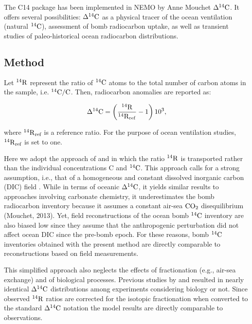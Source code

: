\documentclass[../main/TOP_manual]{subfiles}
\begin{document}
The C14 package has been implemented in NEMO by Anne Mouchet $\Delta ^{14}\mathrm{C}$.
It offers several possibilities: $\Delta ^{14}\mathrm{C}$ as a physical tracer of the ocean ventilation (natural $\mathrm{^{14}C}$), assessment of bomb radiocarbon uptake, as well as transient studies of paleo-historical ocean radiocarbon distributions.

\subsection*{Method}

Let  $\mathrm{^{14}{R}}$ represent the ratio of $\mathrm{^{14}C}$ atoms to the total number of carbon atoms in the sample, i.e. $\mathrm{^{14}C}/\mathrm{C}$.
Then, radiocarbon anomalies are reported as:

\begin{equation}
\Delta ^{14}\mathrm{C} = \left( \frac{\mathrm{^{14}{R}}}{\mathrm{^{14}{R}}_\mathrm{ref}} - 1 \right) 10^3, \label{eq:c14dcq}
\end{equation}

where $\mathrm{^{14}{R}}_{\textrm{ref}}$ is a reference ratio.
For the purpose of ocean ventilation studies, $\mathrm{^{14}{R}}_{\textrm{ref}}$ is set to one.

Here we adopt the approach of \cite{fiadeiro_1982} and \cite{toggweiler_1989a,toggweiler_1989b} in which  the ratio $\mathrm{^{14}{R}}$ is transported rather than the individual concentrations C and $\mathrm{^{14}C}$.
This approach calls for a strong assumption, i.e., that of a homogeneous and constant dissolved inorganic carbon (DIC) field \citep{toggweiler_1989a,mouchet_2013}.
While in terms of
oceanic $\Delta ^{14}\mathrm{C}$, it yields similar results to approaches involving carbonate chemistry, it underestimates the bomb radiocarbon inventory because it assumes a constant air-sea $\mathrm{CO_2}$ disequilibrium (Mouchet, 2013).
Yet, field reconstructions of the ocean bomb $\mathrm{^{14}C}$ inventory are also biased low \citep{naegler_2009} since they assume that the anthropogenic perturbation did not affect ocean DIC since the pre-bomb epoch.
For these reasons, bomb $\mathrm{^{14}C}$ inventories obtained with the present method are directly comparable to reconstructions based on field measurements.

This simplified approach also neglects the effects of fractionation (e.g.,  air-sea exchange) and of biological processes.
Previous studies by \cite{bacastow_1990} and \cite{joos_1997} resulted in nearly identical $\Delta ^{14}\mathrm{C}$ distributions among experiments considering biology or not.
Since observed $\mathrm{^{14}{R}}$ ratios are corrected for the isotopic fractionation when converted to the standard $\Delta ^{14}\mathrm{C}$ notation \citep{stuiver_1977} the model results are directly comparable to observations.
\end{document}
